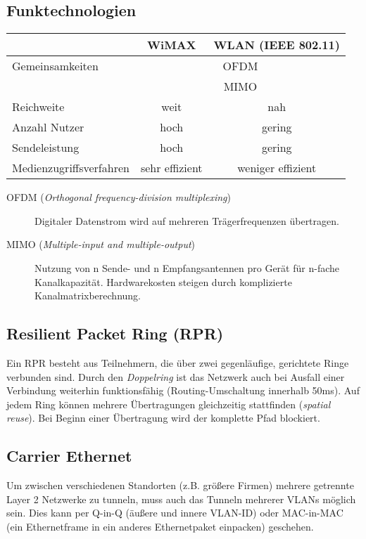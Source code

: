 \documentclass[a4paper]{article}
\begin{document}
\subsection{Funktechnologien}
\begin{tabular}{l|c|c}
    & WiMAX & WLAN (IEEE 802.11) \\ \hline
    Gemeinsamkeiten & \multicolumn{2}{c}{OFDM} \\
    & \multicolumn{2}{c}{MIMO} \\ \hline
    Reichweite & weit & nah \\
    Anzahl Nutzer & hoch & gering \\
    Sendeleistung & hoch & gering \\
    Medienzugriffsverfahren & sehr effizient & weniger effizient
\end{tabular}

\begin{description}
    \item[OFDM (\textit{Orthogonal frequency-division multiplexing})] Digitaler Datenstrom wird auf mehreren Trägerfrequenzen übertragen.
    \item[MIMO (\textit{Multiple-input and multiple-output})] Nutzung von n Sende- und n Empfangsantennen pro Gerät für n-fache Kanalkapazität. Hardwarekosten steigen durch komplizierte Kanalmatrixberechnung.
\end{description}

\subsection{Resilient Packet Ring (RPR)}
Ein RPR besteht aus Teilnehmern, die über zwei gegenläufige, gerichtete Ringe verbunden sind. Durch den \textit{Doppelring} ist das Netzwerk auch bei Ausfall einer Verbindung weiterhin funktionsfähig (Routing-Umschaltung innerhalb 50ms). Auf jedem Ring können mehrere Übertragungen gleichzeitig stattfinden (\textit{spatial reuse}). Bei Beginn einer Übertragung wird der komplette Pfad blockiert.

\subsection{Carrier Ethernet}
Um zwischen verschiedenen Standorten (z.B. größere Firmen) mehrere getrennte Layer 2 Netzwerke zu tunneln, muss auch das Tunneln mehrerer VLANs möglich sein. Dies kann per Q-in-Q (äußere und innere VLAN-ID) oder MAC-in-MAC (ein Ethernetframe in ein anderes Ethernetpaket einpacken) geschehen.
\end{document}
